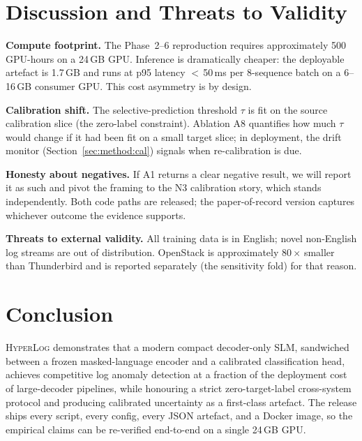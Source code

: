 \documentclass[journal, twoside]{IEEEtran}
\newcommand{\hylog}{\textsc{HyperLog}}
\begin{document}
\section{Discussion and Threats to Validity}\label{sec:discussion}

\textbf{Compute footprint.} The Phase~2--6 reproduction requires
approximately 500\,GPU-hours on a 24\,GB GPU. Inference is dramatically
cheaper: the deployable artefact is 1.7\,GB and runs at p95 latency
$<$\,50\,ms per 8-sequence batch on a 6--16\,GB consumer GPU. This
cost asymmetry is by design.

\textbf{Calibration shift.} The selective-prediction threshold $\tau$
is fit on the source calibration slice (the zero-label constraint).
Ablation A8 quantifies how much $\tau$ would change if it had been
fit on a small target slice; in deployment, the drift monitor
(Section~\ref{sec:method:cal}) signals when re-calibration is due.

\textbf{Honesty about negatives.} If A1 returns a clear negative
result, we will report it as such and pivot the framing to the N3
calibration story, which stands independently. Both code paths are
released; the paper-of-record version captures whichever outcome the
evidence supports.

\textbf{Threats to external validity.} All training data is in
English; novel non-English log streams are out of distribution.
OpenStack is approximately 80\,$\times$ smaller than Thunderbird and
is reported separately (the sensitivity fold) for that reason.

\section{Conclusion}\label{sec:conclusion}

\hylog{} demonstrates that a modern compact decoder-only SLM,
sandwiched between a frozen masked-language encoder and a calibrated
classification head, achieves competitive log anomaly detection at a
fraction of the deployment cost of large-decoder pipelines, while
honouring a strict zero-target-label cross-system protocol and
producing calibrated uncertainty as a first-class artefact. The
release ships every script, every config, every JSON artefact, and a
Docker image, so the empirical claims can be re-verified end-to-end on
a single 24\,GB GPU.

\end{document}

